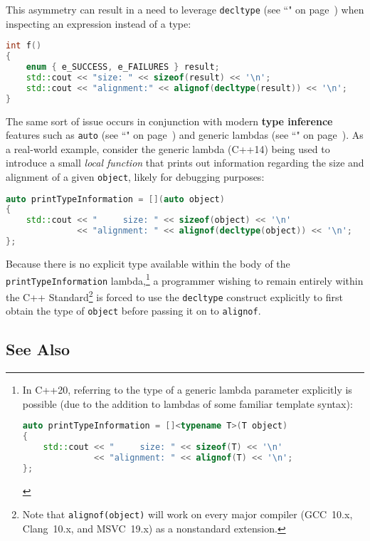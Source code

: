 \noindent This asymmetry can result in a need to leverage
\texttt{decltype} (see ``" on page~\pageref{decltype}) when inspecting an expression instead
of a type:

\begin{lstlisting}[language=C++]
int f()
{
    enum { e_SUCCESS, e_FAILURES } result;
    std::cout << "size: " << sizeof(result) << '\n';
    std::cout << "alignment:" << alignof(decltype(result)) << '\n';
}
\end{lstlisting}
    
\noindent The same sort of issue occurs in conjunction with modern \textbf{type
inference} features such as \texttt{auto} (see ``" on page~\pageref{auto-feature}) and
generic lambdas (see ``" on page~\pageref{genericlambda}). As a real-world example, consider the
generic lambda (C++14) being used to introduce a small
\emph{local function} that prints out information regarding the size and
alignment of a given \texttt{object}, likely for debugging purposes:

\begin{lstlisting}[language=C++]
auto printTypeInformation = [](auto object)
{
    std::cout << "     size: " << sizeof(object) << '\n'
              << "alignment: " << alignof(decltype(object)) << '\n';
};
\end{lstlisting}
    
\noindent Because there is no explicit type available within the body of the
\texttt{printTypeInformation} lambda,{\cprotect\footnote{In C++20, referring to the type of a generic lambda parameter explicitly is possible (due to the addition to lambdas of some familiar template syntax):

\begin{lstlisting}[language=C++, basicstyle={\ttfamily\footnotesize}]
auto printTypeInformation = []<typename T>(T object)
{
    std::cout << "     size: " << sizeof(T) << '\n'
              << "alignment: " << alignof(T) << '\n';
};
\end{lstlisting}
      }} a programmer wishing to remain entirely within the C++
Standard{\cprotect\footnote{Note that \texttt{alignof(object)} will work
on every major compiler (GCC~10.x, Clang~10.x, and MSVC~19.x) as a
  nonstandard extension.}} is forced to use the
\texttt{decltype} construct explicitly to first obtain
the type of \texttt{object} before passing it on to \texttt{alignof}.

\subsection[See Also]{See Also}\label{see-also}

